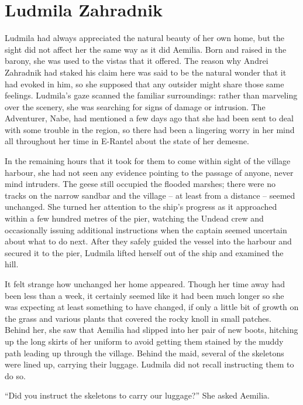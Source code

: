 \chapter{Ludmila Zahradnik}

Ludmila had always appreciated the natural beauty of her own home, but the sight did not affect her the same way as it did Aemilia. Born and raised in the barony, she was used to the vistas that it offered. The reason why Andrei Zahradnik had staked his claim here was said to be the natural wonder that it had evoked in him, so she supposed that any outsider might share those same feelings. Ludmila’s gaze scanned the familiar surroundings: rather than marveling over the scenery, she was searching for signs of damage or intrusion. The Adventurer, Nabe, had mentioned a few days ago that she had been sent to deal with some trouble in the region, so there had been a lingering worry in her mind all throughout her time in E-Rantel about the state of her demesne.

 

In the remaining hours that it took for them to come within sight of the village harbour, she had not seen any evidence pointing to the passage of anyone, never mind intruders. The geese still occupied the flooded marshes; there were no tracks on the narrow sandbar and the village – at least from a distance – seemed unchanged. She turned her attention to the ship’s progress as it approached within a few hundred metres of the pier, watching the Undead crew and occasionally issuing additional instructions when the captain seemed uncertain about what to do next. After they safely guided the vessel into the harbour and secured it to the pier, Ludmila lifted herself out of the ship and examined the hill.

 

It felt strange how unchanged her home appeared. Though her time away had been less than a week, it certainly seemed like it had been much longer so she was expecting at least something to have changed, if only a little bit of growth on the grass and various plants that covered the rocky knoll in small patches. Behind her, she saw that Aemilia had slipped into her pair of new boots, hitching up the long skirts of her uniform to avoid getting them stained by the muddy path leading up through the village. Behind the maid, several of the skeletons were lined up, carrying their luggage. Ludmila did not recall instructing them to do so.

 

“Did you instruct the skeletons to carry our luggage?” She asked Aemilia.

